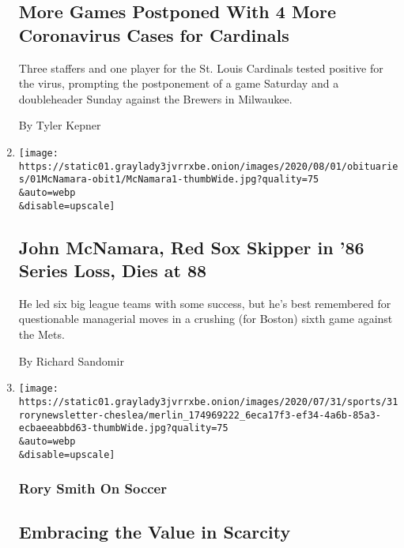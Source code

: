 \begin{enumerate}
{  \subsection{More Games Postponed With 4 More Coronavirus Cases for
  Cardinals}\label{more-games-postponed-with-4-more-coronavirus-cases-for-cardinals}}

  Three staffers and one player for the St. Louis Cardinals tested
  positive for the virus, prompting the postponement of a game Saturday
  and a doubleheader Sunday against the Brewers in Milwaukee.

  By Tyler Kepner
\item
  \href{/2020/07/31/sports/baseball/john-mcnamara-dead.html}{}

  \texttt{[image: https://static01.graylady3jvrrxbe.onion/images/2020/08/01/obituaries/01McNamara-obit1/McNamara1-thumbWide.jpg?quality=75\\\&auto=webp\\\&disable=upscale]}

  \hypertarget{john-mcnamara-red-sox-skipper-in-86-series-loss-dies-at-88}{%
  \subsection{John McNamara, Red Sox Skipper in '86 Series Loss, Dies at
  88}\label{john-mcnamara-red-sox-skipper-in-86-series-loss-dies-at-88}}

  He led six big league teams with some success, but he's best
  remembered for questionable managerial moves in a crushing (for
  Boston) sixth game against the Mets.

  By Richard Sandomir
\item
  \href{/2020/07/31/sports/soccer/soccer-baseball.html}{}

  \texttt{[image: https://static01.graylady3jvrrxbe.onion/images/2020/07/31/sports/31rorynewsletter-cheslea/merlin\_174969222\_6eca17f3-ef34-4a6b-85a3-ecbaeeabbd63-thumbWide.jpg?quality=75\\\&auto=webp\\\&disable=upscale]}

  \hypertarget{rory-smith-on-soccer}{%
  \subsubsection{Rory Smith On Soccer}\label{rory-smith-on-soccer}}

  \hypertarget{embracing-the-value-in-scarcity}{%
  \subsection{Embracing the Value in
  Scarcity}\label{embracing-the-value-in-scarcity}}


\end{enumerate}
